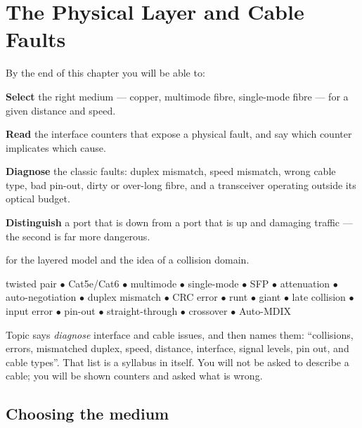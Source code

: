 \chapter{The Physical Layer and Cable Faults}\label{ch:physical}

\begin{outcomes}
By the end of this chapter you will be able to:
\begin{tight}
  \item \textbf{Select} the right medium --- copper, multimode fibre, single-mode
        fibre --- for a given distance and speed.
  \item \textbf{Read} the interface counters that expose a physical fault, and
        say which counter implicates which cause.
  \item \textbf{Diagnose} the classic faults: duplex mismatch, speed mismatch,
        wrong cable type, bad pin-out, dirty or over-long fibre, and a
        transceiver operating outside its optical budget.
  \item \textbf{Distinguish} a port that is down from a port that is up and
        damaging traffic --- the second is far more dangerous.
\end{tight}
\end{outcomes}

\begin{prereq}
 for the layered model and the idea of a collision domain.
\end{prereq}

\begin{keyterms}
twisted pair $\bullet$ Cat5e/Cat6 $\bullet$ multimode $\bullet$ single-mode
$\bullet$ SFP $\bullet$ attenuation $\bullet$ auto-negotiation $\bullet$ duplex
mismatch $\bullet$ CRC error $\bullet$ runt $\bullet$ giant $\bullet$ late
collision $\bullet$ input error $\bullet$ pin-out $\bullet$ straight-through
$\bullet$ crossover $\bullet$ Auto-MDIX
\end{keyterms}

\begin{examnote}
Topic  says \emph{diagnose} interface and cable issues, and then names
them: ``collisions, errors, mismatched duplex, speed, distance, interface, signal
levels, pin out, and cable types''. That list is a syllabus in itself. You will
not be asked to describe a cable; you will be shown counters and asked what is
wrong.
\end{examnote}

\section{Choosing the medium}


